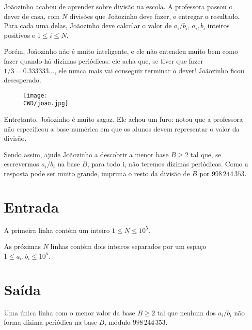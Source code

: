 %

Joãozinho acabou de aprender sobre divisão na escola. A professora passou o dever de casa, com $N$ divisões que Joãozinho deve fazer, e entregar o resultado. Para cada uma delas, Joãozinho deve calcular o valor de $a_i / b_i$, $a_i, b_i$ inteiros positivos e $1 \leq i \leq N$.

Porém, Joãozinho não é muito inteligente, e ele não entendeu muito bem como fazer quando há dízimas periódicas: ele acha que, se tiver que fazer $1 / 3 = 0.333333\dots$, ele nunca mais vai conseguir terminar o dever! Joãozinho ficou desesperado.
\begin{figure}[H]
    \centering
    \texttt{[image: \\CWD/joao.jpg]}
\end{figure}
Entretanto, Joãozinho é muito sagaz. Ele achou um furo: notou que a professora não especificou a base numérica em que os alunos devem representar o valor da divisão.

Sendo assim, ajude Joãozinho a descobrir a menor base $B \geq 2$ tal que, se escrevermos $a_i / b_i$ na base $B$, para todo i, não teremos dízimas periódicas. Como a resposta pode ser muito grande, imprima o resto da divisão de $B$ por $998\,244\,353$.

%
%

\section*{Entrada}

A primeira linha contém um inteiro $1 \leq N \leq 10^5$.

As próximas $N$ linhas contém dois inteiros separados por um espaço $1 \leq a_i, b_i \leq 10^5$.

%
%

\section*{Saída}

Uma única linha com o menor valor da base $B \geq 2$ tal que nenhum dos $a_i / b_i$ não forma dízima periódica na base $B$, módulo $998\,244\,353$.

